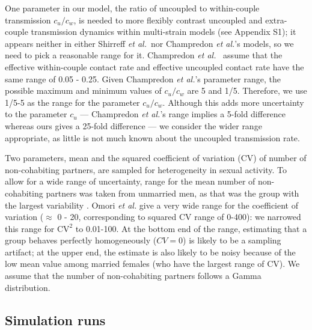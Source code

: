 \documentclass[10pt,letterpaper]{article}
\newcommand{\etal}{\textit{et al.}}
\begin{document}
One parameter in our model, the ratio of uncoupled to within-couple transmission $c_u/c_w$, is needed to more flexibly contrast uncoupled and extra-couple transmission dynamics within multi-strain models (see Appendix S1);
it appears neither in either Shirreff \etal\ nor Champredon \etal's models,  so we need to pick a reasonable range for it. Champredon \etal\ \cite{champredon_hiv_2013} assume that the effective within-couple contact rate and effective uncoupled contact rate have the same range of 0.05 - 0.25.  Given Champredon \etal's parameter range, the possible maximum and minimum values of $c_u/c_w$ are 5 and 1/5. Therefore, we use 1/5-5 as the range for the parameter $c_u/c_w$. Although this adds more uncertainty to the parameter $c_u$ --- Champredon \etal's range implies a 5-fold difference whereas ours gives a 25-fold difference --- we consider the wider range appropriate, as little is not much known about the uncoupled transmission rate.

Two parameters, mean and the squared coefficient of variation (CV) of number of non-cohabiting partners, are sampled for heterogeneity in sexual activity.
To allow for a wide range of uncertainty, range for the mean number of non-cohabiting partners was taken from unmarried men, as that was the group with the largest variability \cite{omori2015dynamics}. 
Omori \etal \cite{omori2015dynamics} give a very wide
range for the coefficient of variation ($\approx$ 0 - 20, corresponding
to squared CV range of 0-400):
we narrowed this range for $\textrm{CV}^2$ to 0.01-100.
At the bottom end of the range, estimating that a group behaves
perfectly homogeneously ($CV=0$) is likely to be a sampling artifact;
at the upper end, the estimate is also likely to be noisy because
of the low mean value among married females (who have the largest
range of CV). 
We assume that the number of non-cohabiting partners follows a Gamma distribution.

\subsection*{Simulation runs}
\end{document}
